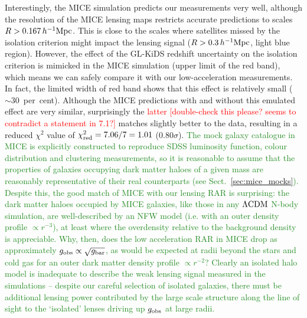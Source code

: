 \documentclass[usenatbib]{mnras}
\newcommand{\hMpc}{\, h^{-1}{\rm{Mpc}} }
\newcommand{\lcdm}{{\rm \Lambda CDM}}
\newcommand{\un}[1]{_{\rm #1}}
\begin{document}
Interestingly, the MICE simulation predicts our measurements very well, although the resolution of the MICE lensing maps restricts accurate predictions to scales $R > 0.167 \hMpc$. This is close to the scales where satellites missed by the isolation criterion might impact the lensing signal ($R > 0.3 \hMpc$, light blue region). However, the effect of the GL-KiDS redshift uncertainty on the isolation criterion is mimicked in the MICE simulation (upper limit of the red band), which means we can safely compare it with our low-acceleration measurements. In fact, the limited width of red band shows that this effect is relatively small ($\sim 30$~per~cent). Although the MICE predictions with and without this emulated effect are very similar, surprisingly the \textcolor{red}{latter [double-check this please? seems to contradict a statement in 7.1?]} matches slightly better to the data, resulting in a reduced $\chi^2$ value of $\chi\un{red}^2 = 7.06 / 7 = 1.01$ ($0.80 \sigma$). \textcolor{ForestGreen}{The mock galaxy catalogue in MICE is explicitly constructed to reproduce SDSS luminosity function, colour distribution and clustering measurements, so it is reasonable to assume that the properties of galaxies occupying dark matter haloes of a given mass are reasonably representative of their real counterparts (see Sect.~\ref{sec:mice_mocks}). Despite this, the good match of MICE with our lensing RAR is surprising: the dark matter haloes occupied by MICE galaxies, like those in any $\lcdm$ N-body simulation, are well-described by an NFW model (i.e. with an outer density profile $\propto r^{-3}$), at least where the overdensity relative to the background density is appreciable. Why, then, does the low acceleration RAR in MICE drop as approximately $g\un{obs}\propto\sqrt{g\un{bar}}$, as would be expected at radii beyond the stars and cold gas for an outer dark matter density profile $\propto r^{-2}$? Clearly an isolated halo model is inadequate to describe the weak lensing signal measured in the simulations -- despite our careful selection of isolated galaxies, there must be additional lensing power contributed by the large scale structure along the line of sight to the `isolated' lenses driving up $g_{\rm obs}$ at large radii.}
\end{document}
